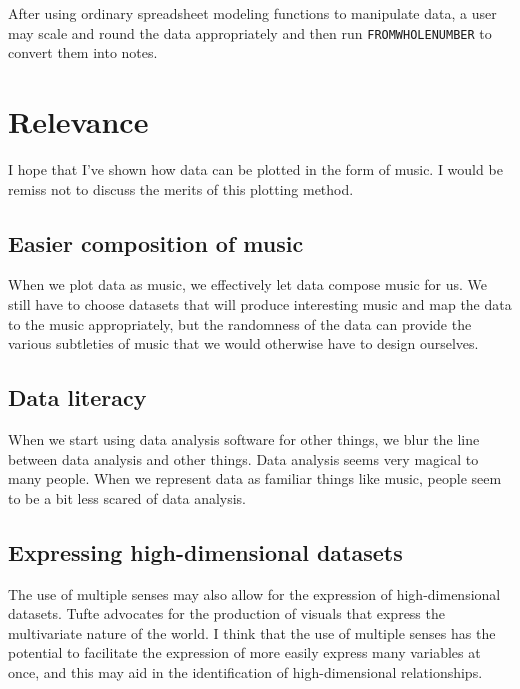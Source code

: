 \documentclass{acm_proc_article-sp}
\begin{document}
After using ordinary spreadsheet modeling functions to manipulate data,
a user may scale and round the data appropriately and then run
\texttt{FROMWHOLENUMBER} to convert them into notes.

\section{Relevance}
I hope that I've shown how data can be plotted in the form of music.
I would be remiss not to discuss the merits of this plotting method.

\subsection{Easier composition of music}
When we plot data as music, we effectively let data compose music for us.
We still have to choose datasets that will produce interesting music and
map the data to the music appropriately, but the randomness of the data
can provide the various subtleties of music that we would otherwise have
to design ourselves.

\subsection{Data literacy}
When we start using data analysis software for other things,
we blur the line between data analysis and other things.
Data analysis seems very magical to many people. When we represent
data as familiar things like music, people seem to be a bit less
scared of data analysis.

\subsection{Expressing high-dimensional datasets}
The use of multiple senses may also allow for the expression of
high-dimensional datasets. Tufte advocates for the production of
visuals that express the multivariate nature of the world.\cite{tufte}
I think that the use of multiple senses has the potential to
facilitate the expression of more easily express many variables at
once, and this may aid in the identification of high-dimensional
relationships.



\balancecolumns
\end{document}
